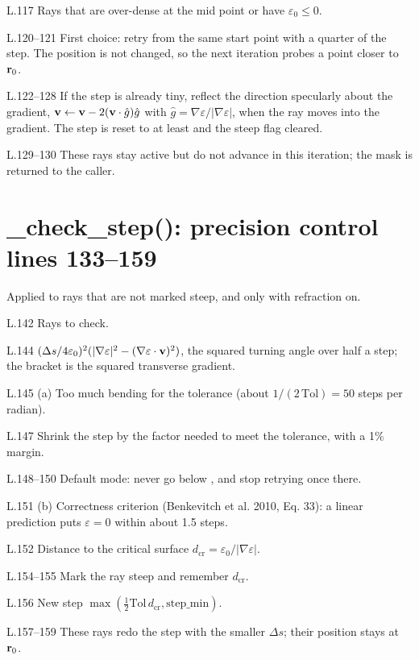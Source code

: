 \begin{lines}
\item[L.117] Rays that are over-dense at the mid point or have $\varepsilon_0\le0$.
\item[L.120–121] First choice: retry from the same start point with a quarter of the step. The position is not changed, so the next iteration probes a point closer to $\mathbf{r}_0$.
\item[L.122–128] If the step is already tiny, reflect the direction specularly about the gradient, $\mathbf{v}\leftarrow\mathbf{v}-2(\mathbf{v}\cdot\hat g)\hat g$ with $\hat g=\nabla\varepsilon/|\nabla\varepsilon|$, when the ray moves into the gradient. The step is reset to at least  and the steep flag cleared.
\item[L.129–130] These rays stay active but do not advance in this iteration; the mask is returned to the caller.
\end{lines}
\section*{\normalsize \_check\_step(): precision control \hfill{\small\mdseries\color{gray}lines 133--159}}

Applied to rays that are not marked steep, and only with refraction on.

\begin{lines}
\item[L.142] Rays to check.
\item[L.144] $(\Delta s/4\varepsilon_0)^2(|\nabla\varepsilon|^2-(\nabla\varepsilon\cdot\mathbf{v})^2)$, the squared turning angle over half a step; the bracket is the squared transverse gradient.
\item[L.145] (a) Too much bending for the tolerance (about $1/(2\,\text{Tol})=50$ steps per radian).
\item[L.147] Shrink the step by the factor needed to meet the tolerance, with a 1\% margin.
\item[L.148–150] Default mode: never go below , and stop retrying once there.
\item[L.151] (b) Correctness criterion (Benkevitch et al. 2010, Eq. 33): a linear prediction puts $\varepsilon=0$ within about 1.5 steps.
\item[L.152] Distance to the critical surface $d_\text{cr}=\varepsilon_0/|\nabla\varepsilon|$.
\item[L.154–155] Mark the ray steep and remember $d_\text{cr}$.
\item[L.156] New step $\max(\tfrac12\text{Tol}\,d_\text{cr}, \text{step\_min})$.
\item[L.157–159] These rays redo the step with the smaller $\Delta s$; their position stays at $\mathbf{r}_0$.
\end{lines}
